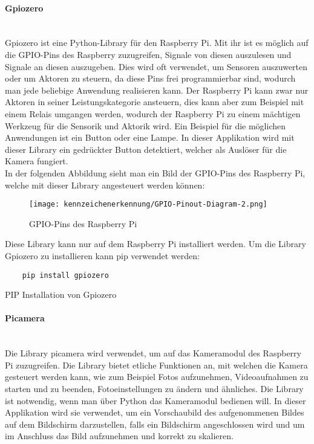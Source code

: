 \paragraph{Gpiozero}\mbox{}\\
Gpiozero ist eine Python-Library für den Raspberry Pi. Mit ihr ist es möglich auf die GPIO-Pins des Raspberry zuzugreifen, Signale von diesen 
auszulesen und Signale an diesen auszugeben. Dies wird oft verwendet, um Sensoren auszuwerten oder um Aktoren zu steuern, da diese Pins frei 
programmierbar sind, wodurch man jede beliebige Anwendung realisieren kann. Der Raspberry Pi kann zwar nur Aktoren in seiner Leistungskategorie ansteuern, 
dies kann aber zum Beispiel mit einem Relais umgangen werden, wodurch der Raspberry Pi zu einem mächtigen Werkzeug für die Sensorik und Aktorik wird. 
Ein Beispiel für die möglichen Anwendungen ist ein Button oder eine Lampe. In dieser Applikation wird mit dieser Library ein gedrückter Button detektiert, 
welcher als Auslöser für die Kamera fungiert.\\

In der folgenden Abbildung sieht man ein Bild der GPIO-Pins des Raspberry Pi, welche mit dieser Library angesteuert werden können:

\begin{figure}[H]
    \centering
    \texttt{[image: kennzeichenerkennung/GPIO-Pinout-Diagram-2.png]}
    \caption{GPIO-Pins des Raspberry Pi}
\end{figure}

Diese Library kann nur auf dem Raspberry Pi installiert werden. Um die Library Gpiozero zu installieren kann pip verwendet werden:

\begin{listing}[H]
    \begin{verbatim}
    pip install gpiozero
    \end{verbatim}
    \caption{PIP Installation von Gpiozero}
\end{listing}

\paragraph{Picamera}\mbox{}\\
Die Library picamera wird verwendet, um auf das Kameramodul des Raspberry Pi zuzugreifen. Die Library bietet etliche Funktionen an, 
mit welchen die Kamera gesteuert werden kann, wie zum Beispiel Fotos aufzunehmen, Videoaufnahmen zu starten und zu beenden, Fotoeinstellungen 
zu ändern und ähnliches. Die Library ist notwendig, wenn man über Python das Kameramodul bedienen will. In dieser Applikation wird sie verwendet, 
um ein Vorschaubild des aufgenommenen Bildes auf dem Bildschirm darzustellen, falls ein Bildschirm angeschlossen wird und um im 
Anschluss das Bild aufzunehmen und korrekt zu skalieren.\\

